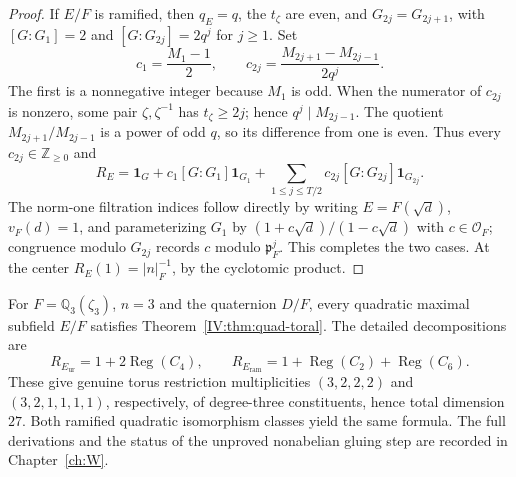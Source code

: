 \begin{proof}
If $E/F$ is ramified, then $q_E=q$, the $t_\zeta$ are even,
and $G_{2j}=G_{2j+1}$, with
$[G:G_1]=2$ and $[G:G_{2j}]=2q^j$ for $j\ge1$.
Set
\[
c_1=\frac{M_1-1}{2},\qquad
c_{2j}=\frac{M_{2j+1}-M_{2j-1}}{2q^j}.
\]
The first is a nonnegative integer because $M_1$ is odd.
When the numerator of $c_{2j}$ is nonzero, some pair
$\zeta,\zeta^{-1}$ has $t_\zeta\ge2j$; hence
$q^j\mid M_{2j-1}$.  The quotient
$M_{2j+1}/M_{2j-1}$ is a power of odd $q$, so its difference
from one is even.  Thus every $c_{2j}\in\mathbb Z_{\ge0}$ and
\[
R_E=\mathbf1_G+c_1[G:G_1]\mathbf1_{G_1}
+\sum_{1\le j\le T/2}c_{2j}[G:G_{2j}]\mathbf1_{G_{2j}}.
\]
The norm-one filtration indices follow directly by writing
$E=F(\sqrt d)$, $v_F(d)=1$, and parameterizing
$G_1$ by $(1+c\sqrt d)/(1-c\sqrt d)$ with $c\in\mathcal O_F$;
congruence modulo $G_{2j}$ records $c$ modulo
$\mathfrak p_F^j$.  This completes the two cases.
At the center $R_E(1)=|n|_F^{-1}$, by the cyclotomic product.
\end{proof}

\begin{remark}\label{IV:prop:all-three-tori}
For $F=\mathbb Q_3(\zeta_3)$, $n=3$ and the quaternion
$D/F$, every quadratic maximal subfield $E/F$ satisfies
Theorem~\ref{IV:thm:quad-toral}.  The detailed decompositions are
\[
R_{E_{\mathrm{ur}}}=1+2\operatorname{Reg}(C_4),\qquad
R_{E_{\mathrm{ram}}}
=1+\operatorname{Reg}(C_2)+\operatorname{Reg}(C_6).
\]
These give genuine torus restriction multiplicities
$(3,2,2,2)$ and $(3,2,1,1,1,1)$, respectively, of
degree-three constituents, hence total dimension $27$.
Both ramified quadratic isomorphism classes yield the same
formula.  The full derivations and the status of the unproved
nonabelian gluing step are recorded in Chapter~\ref{ch:W}.
\end{remark}

